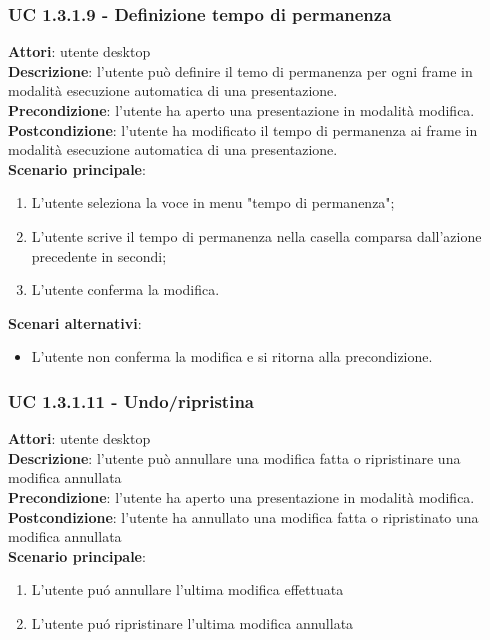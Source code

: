 \subsubsection{UC 1.3.1.9 - Definizione tempo di permanenza}{
	\label{uc1.3.1.9}
	\textbf{Attori}: utente desktop \\
	\textbf{Descrizione}: l'utente può definire il temo di permanenza per ogni frame in modalità esecuzione automatica di una presentazione. \\
	\textbf{Precondizione}: l'utente ha aperto una presentazione in modalità modifica.	\\
	\textbf{Postcondizione}: l'utente ha modificato il tempo di permanenza ai frame in modalità esecuzione automatica di una presentazione.	\\
	\textbf{Scenario principale}:
	\begin{enumerate}
		\item L'utente seleziona la voce in menu "tempo di permanenza";
		\item L'utente scrive il tempo di permanenza nella casella comparsa dall'azione precedente in secondi;
		\item L'utente conferma la modifica.
	\end{enumerate}
	\textbf{Scenari alternativi}:
	\begin{itemize}
		\item L'utente non conferma la modifica  e si ritorna alla precondizione.
	\end{itemize}
}
\subsubsection{UC 1.3.1.11 - Undo/ripristina }{
	\label{uc1.3.1.10}
	\textbf{Attori}: utente desktop \\
	\textbf{Descrizione}: l'utente può annullare una modifica fatta o ripristinare una modifica annullata \\
	\textbf{Precondizione}: l'utente ha aperto una presentazione in modalità modifica.	\\
	\textbf{Postcondizione}: l'utente ha annullato una modifica fatta o ripristinato una modifica annullata	\\
	\textbf{Scenario principale}:
	\begin{enumerate}
		\item L'utente pu\'o annullare l'ultima modifica effettuata
		\item L'utente pu\'o ripristinare l'ultima modifica annullata
	\end{enumerate}
}
